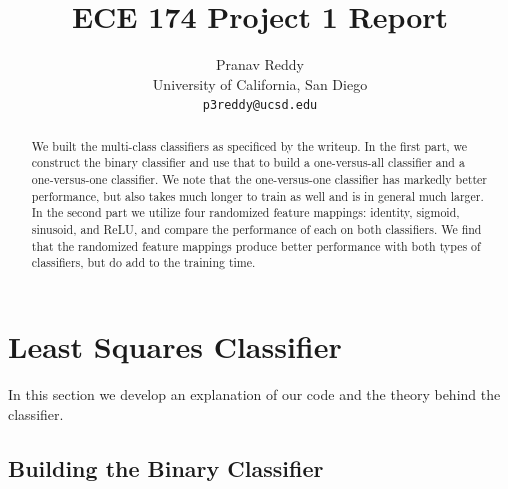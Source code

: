 \documentclass{article}
\title{ECE 174 Project 1 Report}
\author{Pranav Reddy
\\
  University of California, San Diego\\
  \texttt{p3reddy@ucsd.edu} \\
}
\begin{document}
\maketitle


\begin{abstract}
  We built the multi-class classifiers as specificed by the writeup.
  In the first part, we construct the binary classifier and use that to build a one-versus-all classifier and a one-versus-one classifier.
  We note that the one-versus-one classifier has markedly better performance, but also takes much longer to train as well and is in general much larger.
  In the second part we utilize four randomized feature mappings: identity, sigmoid, sinusoid, and ReLU, and compare the performance of each on both classifiers.
  We find that the randomized feature mappings produce better performance with both types of classifiers, but do add to the training time.
\end{abstract}


\section{Least Squares Classifier}


In this section we develop an explanation of our code and the theory behind the classifier.

\subsection{Building the Binary Classifier}
\end{document}
